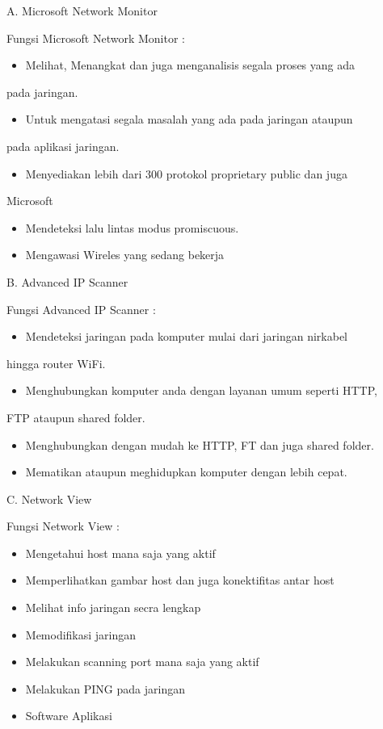 \documentclass[11pt]{article}
\begin{document}
A. Microsoft Network Monitor

Fungsi Microsoft Network Monitor :
\begin{itemize}
\item Melihat, Menangkat dan juga menganalisis segala proses yang ada
\end{itemize}
pada jaringan.
\begin{itemize}
\item Untuk mengatasi segala masalah yang ada pada jaringan ataupun
\end{itemize}
pada aplikasi jaringan.
\begin{itemize}
\item Menyediakan lebih dari 300 protokol proprietary public dan juga
\end{itemize}
Microsoft
\begin{itemize}
\item Mendeteksi lalu lintas modus promiscuous.
\item Mengawasi Wireles yang sedang bekerja
\end{itemize}

B. Advanced IP Scanner

Fungsi Advanced IP Scanner :
\begin{itemize}
\item Mendeteksi jaringan pada komputer mulai dari jaringan nirkabel
\end{itemize}
hingga router WiFi.
\begin{itemize}
\item Menghubungkan komputer anda dengan layanan umum seperti HTTP,
\end{itemize}
FTP ataupun shared folder.
\begin{itemize}
\item Menghubungkan dengan mudah ke HTTP, FT dan juga shared folder.
\item Mematikan ataupun meghidupkan komputer dengan lebih cepat.
\end{itemize}



C. Network View

Fungsi Network View :
\begin{itemize}
\item Mengetahui host mana saja yang aktif
\item Memperlihatkan gambar host dan juga konektifitas antar host
\item Melihat info jaringan secra lengkap
\item Memodifikasi jaringan
\item Melakukan scanning port mana saja yang aktif
\item Melakukan PING pada jaringan

\item Software Aplikasi
\end{itemize}
\end{document}
